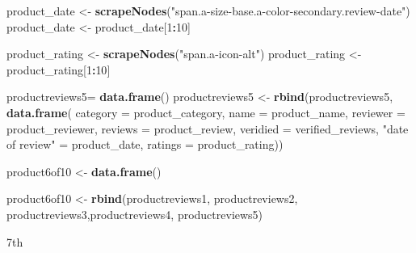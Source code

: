 \documentclass[
]{article}
\newenvironment{Shaded}{\begin{snugshade}}{\end{snugshade}}
\newcommand{\AttributeTok}[1]{\textcolor[rgb]{0.13,0.29,0.53}{#1}}
\newcommand{\DecValTok}[1]{\textcolor[rgb]{0.00,0.00,0.81}{#1}}
\newcommand{\FunctionTok}[1]{\textcolor[rgb]{0.13,0.29,0.53}{\textbf{#1}}}
\newcommand{\NormalTok}[1]{#1}
\newcommand{\OtherTok}[1]{\textcolor[rgb]{0.56,0.35,0.01}{#1}}
\newcommand{\SpecialCharTok}[1]{\textcolor[rgb]{0.81,0.36,0.00}{\textbf{#1}}}
\newcommand{\StringTok}[1]{\textcolor[rgb]{0.31,0.60,0.02}{#1}}
\begin{document}
\begin{Shaded}
\begin{Highlighting}[]
\NormalTok{  product\_date }\OtherTok{\textless{}{-}} \FunctionTok{scrapeNodes}\NormalTok{(}\StringTok{"span.a{-}size{-}base.a{-}color{-}secondary.review{-}date"}\NormalTok{)}
\NormalTok{  product\_date }\OtherTok{\textless{}{-}}\NormalTok{ product\_date[}\DecValTok{1}\SpecialCharTok{:}\DecValTok{10}\NormalTok{]}
  
\NormalTok{  product\_rating }\OtherTok{\textless{}{-}} \FunctionTok{scrapeNodes}\NormalTok{(}\StringTok{"span.a{-}icon{-}alt"}\NormalTok{)}
\NormalTok{  product\_rating }\OtherTok{\textless{}{-}}\NormalTok{ product\_rating[}\DecValTok{1}\SpecialCharTok{:}\DecValTok{10}\NormalTok{]}
  
\NormalTok{  productreviews5}\OtherTok{=} \FunctionTok{data.frame}\NormalTok{()}
\NormalTok{  productreviews5 }\OtherTok{\textless{}{-}} \FunctionTok{rbind}\NormalTok{(productreviews5, }\FunctionTok{data.frame}\NormalTok{(}
                      \AttributeTok{category =}\NormalTok{ product\_category,}
                      \AttributeTok{name =}\NormalTok{ product\_name,}
                      \AttributeTok{reviewer =}\NormalTok{ product\_reviewer,}
                      \AttributeTok{reviews =}\NormalTok{ product\_review,}
                      \AttributeTok{veridied =}\NormalTok{ verified\_reviews,}
                      \StringTok{"date of review"} \OtherTok{=}\NormalTok{ product\_date,}
                      \AttributeTok{ratings =}\NormalTok{ product\_rating))}
  
\NormalTok{  product6of10 }\OtherTok{\textless{}{-}} \FunctionTok{data.frame}\NormalTok{()}
  
\NormalTok{  product6of10 }\OtherTok{\textless{}{-}} \FunctionTok{rbind}\NormalTok{(productreviews1, productreviews2, productreviews3,productreviews4, productreviews5)}
\end{Highlighting}
\end{Shaded}

7th
\end{document}
